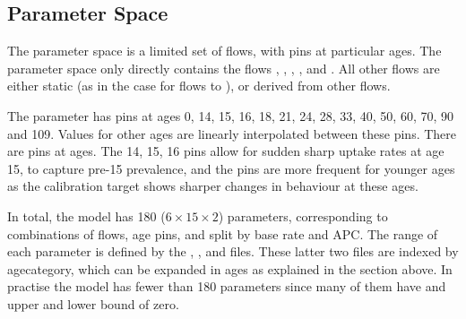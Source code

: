 \documentclass[]{article}
\begin{document}
	\subsection{Parameter Space}
	The parameter space is a limited set of flows, with pins at particular ages. The parameter space only directly contains the flows , , , ,  and . All other flows are either static (as in the case for flows to ), or derived from other flows.
	
	The parameter has pins at ages 0, 14, 15, 16, 18, 21, 24, 28, 33, 40, 50, 60, 70, 90 and 109. Values for other ages are linearly interpolated between these pins. There are pins at ages. The 14, 15, 16 pins allow for sudden sharp uptake rates at age 15, to capture pre-15 prevalence, and the pins are more frequent for younger ages as the calibration target shows sharper changes in behaviour at these ages.
	
	In total, the model has 180 ($6 \times 15 \times 2$) parameters, corresponding to combinations of flows, age pins, and split by base rate and APC. The range of each parameter is defined by the , ,  and  files. These latter two files are indexed by agecategory, which can be expanded in ages as explained in the section above. In practise the model has fewer than 180 parameters since many of them have and upper and lower bound of zero.
	
	
\end{document}
